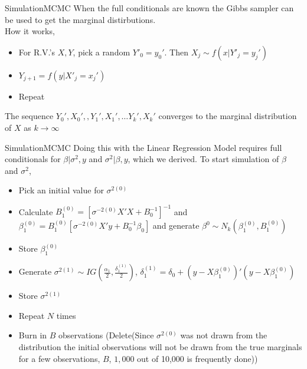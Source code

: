 \documentclass[table]{beamer}
\begin{document}
\begin{frame}{Simulation}{MCMC}
	When the full conditionals are known the Gibbs sampler can be used to get the marginal distirbutions. \\ How it works,
	\begin{itemize}
		\item For R.V.'s $ X, Y $, pick a random $ Y'_0= y_0' $. Then  $ X_j \sim f(x | Y'_j = y_j' ) $
		\item $ Y_{j+1} = f(y |X'_j = x_j') $
		\item Repeat
	\end{itemize}
	The sequence $ Y_0', X_0', , Y_1', X_1', \dots Y_k', X_k' $ converges to the marginal distribution of $ X $ as $ k\rightarrow \infty $
\end{frame}

\begin{frame}{Simulation}{MCMC}
	Doing this with the Linear Regression Model requires full conditionals for $ \beta| \sigma^2, y $ and $ \sigma^2|\beta, y $, which we derived. To start simulation of $ \beta $ and $ \sigma^2 $, 
	\begin{itemize}
		\item Pick an initial value for $ \sigma^{2(0)} $
		\item Calculate $ B_1^{(0)} = [\sigma^{-2(0)} X'X + B_0^{-1}]^{-1}$ and $ \beta_1^{(0)} = B_1^{(0)}[\sigma^{-2(0)}X'y + B_0^{-1}\beta_0 ] $ and generate $ \beta^{0} \sim N_k(\beta_1^{(0)}, B_1^{(0)}) $
		\item Store $ \beta_1^{(0)} $
		\item Generate $ \sigma^{2(1)} \sim IG(\frac{\alpha_1}{2}, \frac{\delta_1^{ (1) }} {2}  )$, $ \delta_1^{(1)} = \delta_0 + (y-X\beta_1^{(0)})'(y-X\beta_1^{(0)}) $
		\item Store $ \sigma^{2(1)} $
		\item Repeat $ N $ times
		\item Burn in $ B $ observations (Delete(Since $ \sigma^{2(0)} $ was not drawn from the distribution the initial observations will not be drawn from the true marginals for a few observations, $ B $, $ 1,000 $ out of 10,000 is frequently done))
	\end{itemize}
\end{frame}
\end{document}
